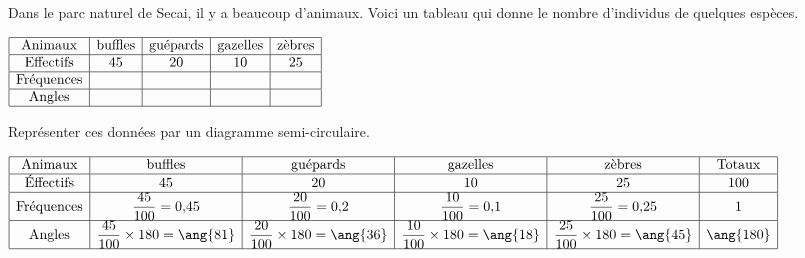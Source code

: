 \begin{corrige}
    Dans le parc naturel de Secai, il y a beaucoup d'animaux.
    Voici un tableau qui donne le nombre d'individus de quelques espèces.
    
    \smallskip
    $\begin{array}{|c|c|c|c|c|}
    \hline
    \text{Animaux} & \text{buffles} & \text{guépards} & \text{gazelles} & \text{zèbres}\\
    \hline
    \text{Effectifs} & 45 & 20 & 10 & 25\\
    \hline
    \text{Fréquences} &   &   &   &  \\
    \hline
    \text{Angles} &   &   &   &  \\
    \hline
    \end{array}$    
    
    \smallskip
    Représenter ces données par un diagramme semi-circulaire.
    
    \smallskip
   {\red
    $\renewcommand{\arraystretch}{1}
    \begin{array}{|c|c|c|c|c|c|}
    \hline
    \text{Animaux} & \text{buffles} & \text{guépards} & \text{gazelles} & \text{zèbres} & \text{Totaux}\\
    \hline
    \text{Éffectifs} & 45 & 20 & 10 & 25 & 100\\
    \hline
    \text{Fréquences} & \dfrac{45}{100}=0{,}45 & \dfrac{20}{100}=0{,}2 & \dfrac{10}{100}=0{,}1 & \dfrac{25}{100}=0{,}25 & 1\\
    \hline
    \text{Angles} & \dfrac{45}{100} \times 180 = \ang{81} & \dfrac{20}{100} \times 180 = \ang{36} & \dfrac{10}{100} \times 180 = \ang{18} & \dfrac{25}{100} \times 180 = \ang{45} & \ang{180}\\
    \hline
    \end{array}
    \renewcommand{\arraystretch}{1}$

    \medskip
    \begin{tikzpicture}[baseline,scale=0.5]
    

\end{tikzpicture}}
\end{corrige}
